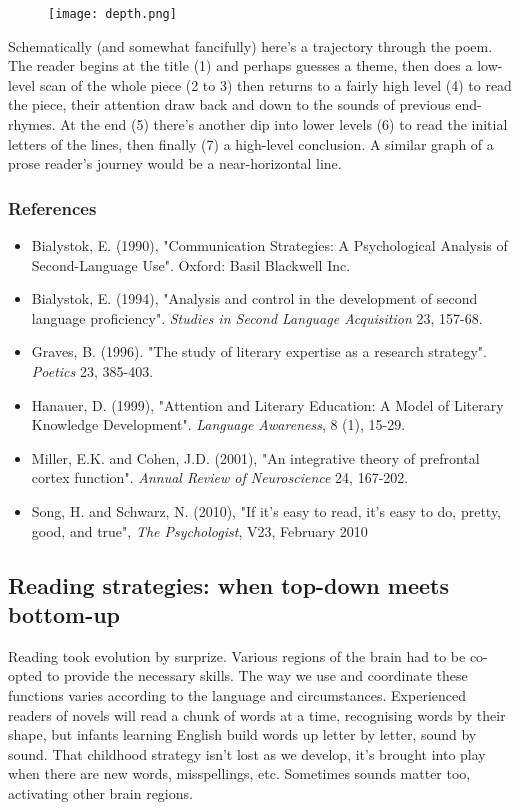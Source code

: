 \documentclass[11pt]{article}
\begin{document}
\begin{figure}[htbp]
\centering
\texttt{[image: depth.png]}
\end{figure}
 Schematically (and somewhat
  fancifully) here's a trajectory through the poem. The reader begins at
the title (1) and perhaps guesses a theme, then does a low-level scan of 
the whole piece (2 to 3) then returns to a fairly high level (4) to
read the piece, their attention draw back and down to the sounds of 
previous end-rhymes. At the end (5) there's another dip into lower levels (6)
to read the initial letters of the lines, then finally (7) a high-level
conclusion. A similar graph of a prose reader's journey would be a
  near-horizontal line.
\subsubsection*{References}
\begin{itemize}
\item Bialystok, E. (1990), "Communication Strategies: A Psychological Analysis of
  Second-Language Use". Oxford: Basil Blackwell Inc.
\item Bialystok, E. (1994), "Analysis and control in the development of second language
proficiency". \textit{Studies in Second Language Acquisition} 23, 157-68.
\item Graves, B. (1996). "The study of literary expertise as a research strategy". \textit{Poetics} 23, 385-403.
\item  Hanauer, D. (1999), "Attention and Literary Education: A Model
of Literary Knowledge Development". \textit{Language Awareness}, 8 (1), 15-29.

\item Miller, E.K. and Cohen, J.D. (2001), "An
  integrative theory of prefrontal cortex function". \textit{Annual Review of Neuroscience} 24,
  167-202.
\item Song, H. and Schwarz, N. (2010), "If it's easy to read, it's easy to
  do, pretty, good, and true", \textit{The Psychologist}, V23, February 2010
\end{itemize}

\newpage\subsection{Reading strategies: when top-down meets bottom-up}

Reading took evolution by surprize. Various regions of the brain had to be co-opted to provide the necessary skills. The way we use and coordinate these functions varies according to the language and circumstances. Experienced readers of novels will read a chunk of words at a time, recognising words by their shape, but infants learning English build words up letter by letter, sound by sound. That childhood strategy isn't lost as we develop, it's brought into play when there are new words, misspellings, etc. Sometimes sounds matter too, activating other brain regions.
\end{document}
